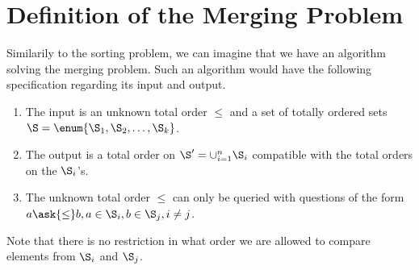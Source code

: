 \section{Definition of the Merging Problem}
\label{tree:merging:def}

Similarily to the sorting problem, we can imagine that we have an algorithm
solving the merging problem. Such an algorithm would have the following
specification regarding its input and output.

\begin{enumerate}
\item The input is an unknown total order \(\le\) and a set of totally ordered
sets \(\S = \enum{\S_1, \S_2, \ldots, \S_k}\).
\item The output is a total order on \(\S' = \cup_{i=1}^{n} \S_i\) compatible with
the total orders on the \(\S_i\)'s.
\item The unknown total order \(\le\) can only be queried with questions of the
form \(a \ask{\le} b, a \in \S_i, b \in \S_j, i \neq j\).
\end{enumerate}

Note that there is no restriction in what order we are allowed to compare
elements from \(\S_i\) and \(\S_j\).

